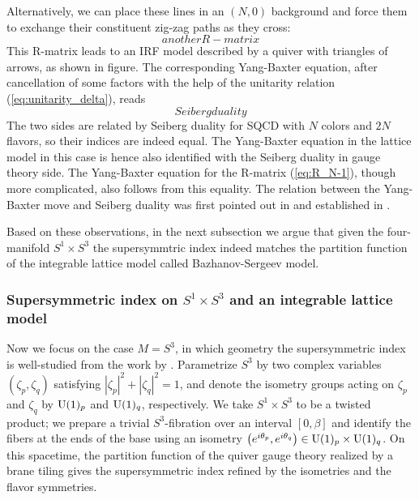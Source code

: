 Alternatively, we can place these lines in an $\left(N,0\right)$
background and force them to exchange their constituent zig-zag paths
as they cross:
\begin{equation}
anotherR-matrix  \label{eq:R_N0}
\end{equation}
 This R-matrix leads to an IRF model described by a quiver with triangles
of arrows, as shown in figure. The corresponding Yang-Baxter equation,
after cancellation of some factors with the help of the unitarity
relation (\ref{eq:unitarity_delta}), reads
\begin{equation}
Seibergduality
\end{equation}
 The two sides are related by Seiberg duality \cite{Seiberg:1994pq} for SQCD
with $N$ colors and $2N$ flavors, so their indices are indeed equal.
The Yang-Baxter equation in the lattice model in this case is hence
also identified with the Seiberg duality in gauge theory side. The
Yang-Baxter equation for the R-matrix (\ref{eq:R_N-1}), though more
complicated, also follows from this equality. The relation between
the Yang-Baxter move and Seiberg duality was first pointed out in
\cite{Hanany:2005ss} and established in \cite{Yamazaki:2012cp}.

Based on these observations, in the next subsection we argue that
given the four-manifold $S^{1} \times S^{3}$ the supersymmtric index
indeed matches the partition function of the integrable lattice model
called Bazhanov-Sergeev model. 




\subsubsection{Supersymmetric index on $S^{1} \times S^{3}$ and an integrable lattice
model}

Now we focus on the case $M=S^{3}$, in which geometry the supersymmetric
index is well-studied from the work by \cite{Romelsberger:2005eg,Kinney:2005ej,Festuccia:2011ws}. Parametrize $S^{3}$ by two complex variables
$\left(\zeta_{p},\zeta_{q}\right)$ satisfying $\left|\zeta_{p}\right|^{2}+\left|\zeta_{q}\right|^{2}=1$,
and denote the isometry groups acting on $\zeta_{p}$ and $\zeta_{q}$
by $\mathrm{U}(1)_{p}$ and $\mathrm{U}(1)_{q}$, respectively. We take $S^{1}\times S^{3}$
to be a twisted product; we prepare a trivial $S^{3}$-fibration over
an interval $[0,\beta]$ and identify the fibers at the ends of the
base using an isometry $\left(e^{i\theta_{p}},e^{i\theta_{q}}\right)\in \mathrm{U}(1)_{p}\times \mathrm{U}(1)_{q}$.
On this spacetime, the partition function of the quiver gauge theory
realized by a brane tiling gives the supersymmetric index refined
by the isometries and the flavor symmetries. 

